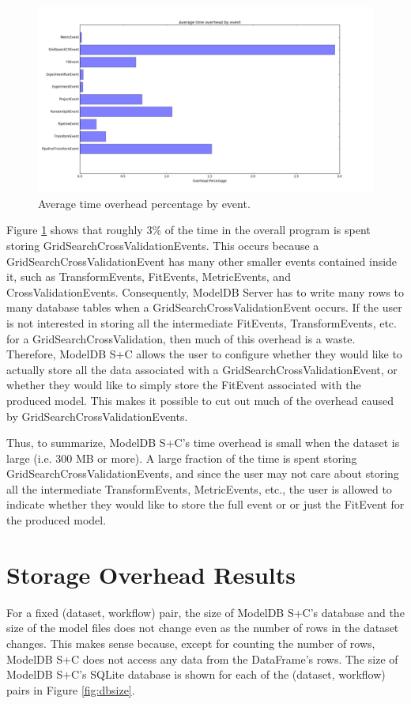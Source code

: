 \begin{figure}
  \centering
  \includegraphics[width=6.0in]{event_time_overhead}
  \caption{
    Average time overhead percentage by event.
  }
  \label{fig:event_time_overhead}
\end{figure}

Figure \ref{fig:event_time_overhead} shows that roughly 3\% of the time in the overall
program is spent storing GridSearchCrossValidationEvents. This occurs because a GridSearchCrossValidationEvent
has many other smaller events contained inside it, such as TransformEvents, FitEvents, MetricEvents, and 
CrossValidationEvents. Consequently, ModelDB Server has to write many rows to many database tables when a
GridSearchCrossValidationEvent occurs. If the user is not interested in storing all the intermediate FitEvents,
TransformEvents, etc. for a GridSearchCrossValidation, then much of this overhead is a waste. Therefore, ModelDB S+C
allows the user to configure whether they would like to actually store all the data associated with a GridSearchCrossValidationEvent,
or whether they would like to simply store the FitEvent associated with the produced model. This makes it possible to cut out
much of the overhead caused by GridSearchCrossValidationEvents.

Thus, to summarize, ModelDB S+C's time overhead is small when the dataset is large (i.e. 300 MB or more). A
large fraction of the time is spent storing GridSearchCrossValidationEvents, and since the user may not
care about storing all the intermediate TransformEvents, MetricEvents, etc., the user is allowed to indicate 
whether they would like to store the full event or or just the FitEvent for the produced model.

\section{Storage Overhead Results}
For a fixed (dataset, workflow) pair, the size of ModelDB S+C's database and the size of the
model files does not change even as the number of rows in the dataset changes. This makes sense
because, except for counting the number of rows, ModelDB S+C does not access any data from the
DataFrame's rows. The size of ModelDB S+C's SQLite database is shown for each of the (dataset, workflow)
pairs in Figure \ref{fig:dbsize}.

